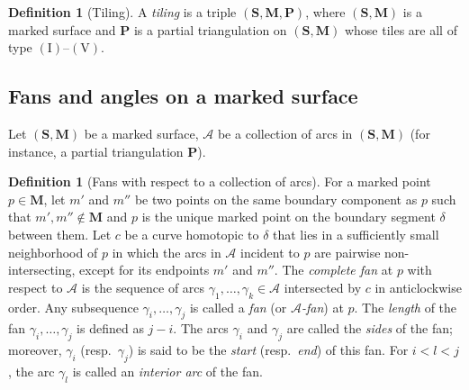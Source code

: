 \documentclass[a4paper,10pt]{amsart}
\theoremstyle{plain}          %
\theoremstyle{definition}
\newtheorem{definition}[theorem]{Definition}
\def\SS{\mathbf{S}}
\def\Pf{\mathbf{P}}
\def\MM{\mathbf{M}}
\def\ba{\mathbf{a}}
\def\PP{\mathbf{P}}
\def\MM{\mathbf{M}}
\begin{document}
\begin{definition}[Tiling]\label{def:tiling}
A \emph{tiling} is a triple $(\SS, \MM, \Pf)$, where $(\SS, \MM)$ is a marked surface and $\Pf$ is a partial triangulation on $(\SS, \MM)$ whose tiles are all of type $\mathrm{(I)}$--$\mathrm{(V)}$.
\end{definition}




\subsection{Fans and angles on a marked surface} \label{ss: faithful dissection}
Let $(\SS,\MM)$ be a marked surface, 
$\mathcal{A}$ be a collection of arcs in $(\SS, \MM)$ (for instance, a partial triangulation $\PP$). 
\begin{definition}[Fans with respect to a collection of arcs]\label{def:fans}
For a marked point $p \in \MM$, let $m'$ and $m''$ be two points on the same boundary component as $p$ such that $m', m'' \notin \MM$ and $p$ is the unique marked point on the boundary segment $\delta$ between them. Let $c$ be a curve homotopic to $\delta$ that lies in a sufficiently small neighborhood of $p$ in which the arcs in $\mathcal{A}$ incident to $p$ are pairwise non-intersecting, except for its endpoints $m'$ and $m''$. The {\it complete fan} at $p$ with respect to $\mathcal{A}$ is the sequence of arcs $\gamma_1, \dots, \gamma_k \in \mathcal{A}$ intersected by $c$ in anticlockwise order. Any subsequence $\gamma_i, \dots, \gamma_j$ is called a {\it fan} (or {\it $\mathcal{A}$-fan}) at $p$. The {\it length} of the fan $\gamma_i, \dots, \gamma_j$ is defined as $j - i$. The arcs $\gamma_i$ and $\gamma_j$ are called the {\it sides} of the fan; moreover, $\gamma_i$ (resp.\ $\gamma_j$) is said to be the {\it start} (resp.\ {\it end}) of this fan. For $i < l < j$, the arc $\gamma_l$ is called an {\it interior arc} of the fan.
\end{definition}
\end{document}
